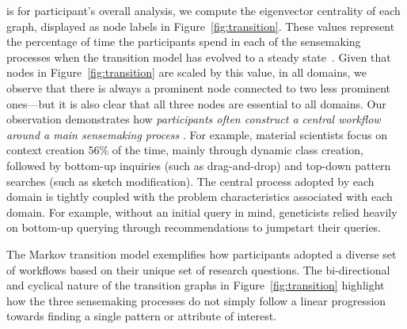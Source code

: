  is for participant's overall analysis,
 we compute the eigenvector centrality of each graph,
 displayed as node labels in Figure~\ref{fig:transition}.
 These values represent the percentage of time the participants
 spend in each of the sensemaking processes
 when the transition model has evolved to a steady state~\cite{pierre2011}.
 Given that nodes in Figure~\ref{fig:transition}
 are scaled by this value, in all domains,
 we observe that there is always a prominent node
 connected to two less prominent ones---but it is also clear
 that all three nodes are essential to all domains.
 Our observation demonstrates how \emph{participants
 often construct a central workflow
 around a main sensemaking process }.  For example,  material scientists focus on context creation 56\% of the time, mainly through dynamic class creation, followed by bottom-up inquiries (such as drag-and-drop) and top-down pattern searches (such as sketch modification).
 The central process adopted by each domain
 is tightly coupled with the problem characteristics associated with each domain. For example, without an initial query in mind,
 geneticists relied heavily on bottom-up querying
 through recommendations to jumpstart their queries.
 \par The Markov transition model exemplifies how participants
 adopted a diverse set of workflows
 based on their unique set of research questions. The bi-directional and cyclical nature
 of the transition graphs in Figure~\ref{fig:transition} highlight how the three sensemaking processes do not simply follow a linear progression towards finding a single pattern or attribute of interest. %
